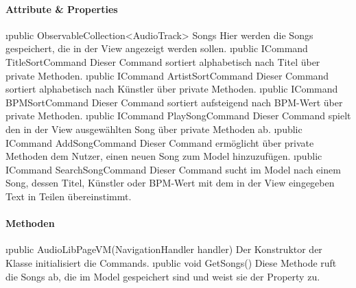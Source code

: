 \documentclass[../entwurf.tex]{subfiles}
\begin{document}
\paragraph{Attribute \& Properties}
\begin{itemize}
	\i{public ObservableCollection<AudioTrack> Songs} Hier werden die Songs gespeichert, die in der View angezeigt werden sollen.
	\i{public ICommand TitleSortCommand} Dieser Command sortiert  alphabetisch nach Titel über private Methoden. 
	\i{public ICommand ArtistSortCommand} Dieser Command sortiert  alphabetisch nach Künstler über private Methoden. 
	\i{public ICommand BPMSortCommand} Dieser Command sortiert  aufsteigend nach BPM-Wert über private Methoden. 
	\i{public ICommand PlaySongCommand} Dieser Command spielt den in der View ausgewählten Song über private Methoden ab. 
	\i{public ICommand AddSongCommand} Dieser Command ermöglicht über private Methoden dem Nutzer, einen neuen Song zum Model hinzuzufügen. 
	\i{public ICommand SearchSongCommand} Dieser Command sucht im Model nach einem Song, dessen Titel, Künstler oder BPM-Wert mit dem in der View eingegeben Text in Teilen übereinstimmt. 
\end{itemize}
\paragraph{Methoden}
\begin{itemize}
	\i{public AudioLibPageVM(NavigationHandler handler)} Der Konstruktor der Klasse initialisiert die Commands.
	\i{public void GetSongs()} Diese Methode ruft die Songs ab, die im Model gespeichert sind und weist sie der Property  zu.
\end{itemize}
\end{document}
